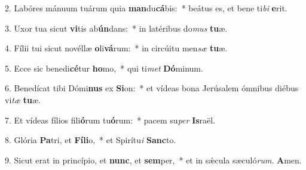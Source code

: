 2. Labóres mánuum tuárum quia \textbf{man}du\textbf{cá}bis:~*  beátus es, et bene ti\textit{bi} \textbf{e}rit.\

3. Uxor tua sicut \textbf{vi}tis ab\textbf{ún}dans:~*  in latéribus do\textit{mus} \textbf{tu}æ.\

4. Fílii tui sicut novéllæ \textbf{o}li\textbf{vá}rum:~*  in circúitu men\textit{sæ} \textbf{tu}æ.\

5. Ecce sic benedi\textbf{cé}tur \textbf{ho}mo,~*  qui ti\textit{met} \textbf{Dó}minum.\

6. Benedícat tibi Dómi\textbf{nus} ex \textbf{Si}on:~*  et vídeas bona Jerúsalem ómnibus diébus vi\textit{tæ} \textbf{tu}æ.\

7. Et vídeas fílios fili\textbf{ó}rum tu\textbf{ó}rum:~*  pacem su\textit{per} \textbf{Is}raël.\

8. Glória \textbf{Pa}tri, et \textbf{Fí}\textbf{li}o,~*  et Spirítu\textit{i} \textbf{Sanc}to.\

9. Sicut erat in princípio, et \textbf{nunc}, et \textbf{sem}per,~*  et in sǽcula sæculó\textit{rum}. \textbf{A}men.\


